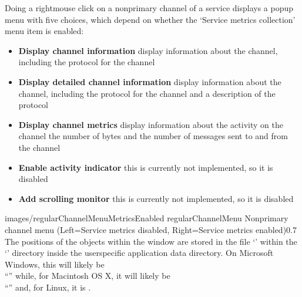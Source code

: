 Doing a right\longDash{}mouse click on a non\longDash{}primary channel of a service
displays a popup menu with five choices, which depend on whether the `Service metrics
collection' menu item is enabled:
\begin{itemize}
\item\textbf{Display channel information} display information about the channel,
including the protocol for the channel
\item\exSp\textbf{Display detailed channel information} display information about the
channel, including the protocol for the channel and a description of the protocol
\item\exSp\textbf{Display channel metrics} display information about the activity on the
channel \longDash{} the number of bytes and the number of messages sent to and from the
channel
\item\exSp\textbf{Enable activity indicator} \longDash{} this is currently not
implemented, so it is disabled
\item\exSp\textbf{Add scrolling monitor} \longDash{} this is currently not implemented, so
it is disabled
\end{itemize}
%
{images/regularChannelMenuMetricsEnabled}%
{regularChannelMenu}%
{Non\longDash{}primary channel menu (Left=Service metrics disabled, Right=Service metrics
enabled)}{0.7}
\clearpage
The positions of the objects within the window are stored in the file
`' within the `' directory inside the
user\longDash{}specific application data directory.
On Microsoft Windows, this will likely be\\
``'' while, for Macintosh OS X, it will likely be\\
``'' and, for Linux, it is \TBD.\\
\primaryEnd{}
